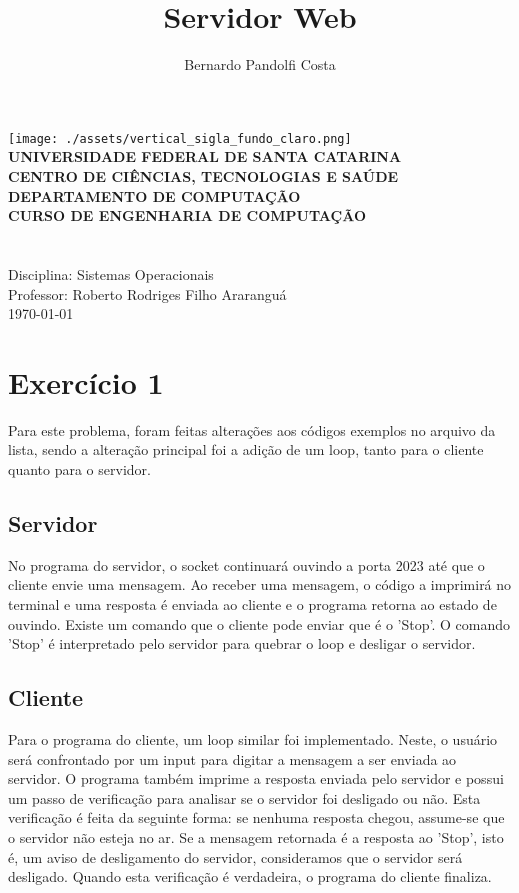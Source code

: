 \documentclass[a4paper,12pt]{article}
\author{Bernardo Pandolfi Costa}
\title{Servidor Web}
\begin{document}
\makeatletter
\begin{titlepage}
    \begin{center}
    \texttt{[image: ./assets/vertical\_sigla\_fundo\_claro.png]}\\
        \small
        \vspace{0.25cm}
        \textbf{UNIVERSIDADE FEDERAL DE SANTA CATARINA}\\
		\textbf{CENTRO DE CIÊNCIAS, TECNOLOGIAS E SAÚDE}\\
		\textbf{DEPARTAMENTO DE COMPUTAÇÃO}\\
		\textbf{CURSO DE ENGENHARIA DE COMPUTAÇÃO}\\
        \vspace{7cm}
        \Large
        \textbf{\@title}\\
        \vspace{0.5cm}
        \normalsize
        \textbf{\@author}\\
        \vspace{1.5cm}
        \small
        Disciplina: Sistemas Operacionais\\
        Professor: Roberto Rodriges Filho
        \vfill
        Araranguá\\
        \today
    \end{center}
\end{titlepage}
\makeatother

\tableofcontents
\newpage

\section{Exercício 1}
Para este problema, foram feitas alterações aos códigos exemplos no arquivo da lista, sendo a alteração principal foi a adição de um loop, tanto para o cliente quanto para o servidor.
\subsection{Servidor}
No programa do servidor, o socket continuará ouvindo a porta 2023 até que o cliente envie uma mensagem.
Ao receber uma mensagem, o código a imprimirá no terminal e uma resposta é enviada ao cliente e o programa retorna ao estado de ouvindo.
Existe um comando que o cliente pode enviar que é o 'Stop'. O comando 'Stop' é interpretado pelo servidor para quebrar o loop e desligar o servidor.
\subsection{Cliente}
Para o programa do cliente, um loop similar foi implementado. Neste, o usuário será confrontado por um input para digitar a mensagem a ser enviada ao servidor.
O programa também imprime a resposta enviada pelo servidor e possui um passo de verificação para analisar se o servidor foi desligado ou não.
Esta verificação é feita da seguinte forma: se nenhuma resposta chegou, assume-se que o servidor não esteja no ar. 
Se a mensagem retornada é a resposta ao 'Stop', isto é, um aviso de desligamento do servidor, consideramos que o servidor será desligado. Quando esta verificação é verdadeira, o programa do cliente finaliza.
\end{document}
